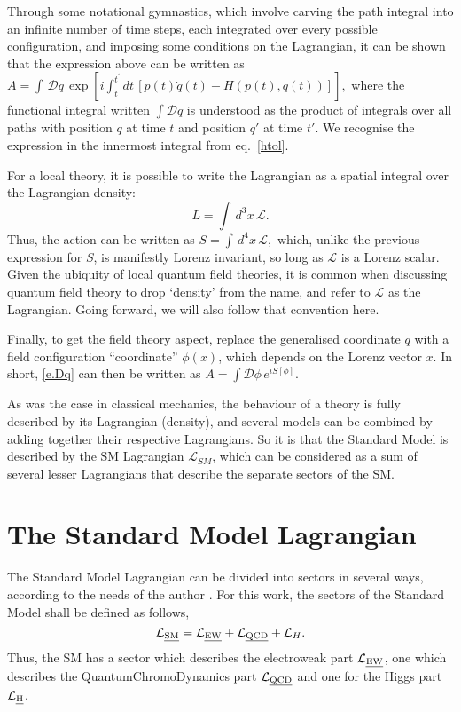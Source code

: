 Through some notational gymnastics, which involve carving the path integral into an infinite number of time steps, each integrated over every possible configuration, and imposing some conditions on the Lagrangian, it can be shown \cite{srednicki} that the expression above can be written as
\(A=\int\,\mathcal Dq\,\exp\left[i\int_t^{t^\prime}dt\,[p(t)\dot q(t)-H(p(t),q(t))]\right],\label{e.Dq}\)
where the functional integral written $\int\mathcal Dq$ is understood as the product of integrals over all paths with position $q$ at time $t$ and position $q\prime$ at time $t\prime$. We recognise the expression in the innermost integral from eq.~\eqref{htol}.

For a local theory, it is possible to write the Lagrangian as a spatial integral over the Lagrangian density:
\[L=\int \,d^3x\,\mathcal L.\]
Thus, the action can be written as
\(S=\int\,d^4x\,\mathcal L,\label{e.S}\)
which, unlike the previous expression for $S$, is manifestly Lorenz invariant, so long as $\mathcal L$ is a Lorenz scalar. Given the ubiquity of local quantum field theories, it is common when discussing quantum field theory to drop `density' from the name, and refer to $\mathcal L$ as the Lagrangian. Going forward, we will also follow that convention here.

Finally, to get the field theory aspect, replace the generalised coordinate $q$ with a field configuration ``coordinate'' $\phi(x)$, which depends on the Lorenz vector $x$. In short, \eqref{e.Dq} can then be written as
\(A=\int\mathcal D\phi\, e^{iS[\phi]}.\label{e.Dphi}\)

As was the case in classical mechanics, the behaviour of a theory is fully described by its Lagrangian (density), and several models can be combined by adding together their respective Lagrangians. So it is that the Standard Model is described by the SM Lagrangian $\mathcal L_\textit{SM}$, which can be considered as a sum of several lesser Lagrangians that describe the separate sectors of the SM.

\section{The Standard Model Lagrangian}

The Standard Model Lagrangian can be divided into sectors in several ways, according to the needs of the author \cite{srednicki,wikism}. For this work, the sectors of the Standard Model shall be defined as follows,
\[\mathcal{L}_{\text{\emph{SM}}}=\mathcal{L}_{\text{\emph{EW}}}+\mathcal{L}_{\text{\emph{QCD}}}+\mathcal{L}_{H}.\]
Thus, the SM has a sector which describes the electroweak part $\mathcal{L}_{\text{\emph{EW}}}$, one which describes the QuantumChromoDynamics part $\mathcal{L}_{\text{\emph{QCD}}}$ and one for the Higgs part $\mathcal{L}_{\text{\emph{H}}}$.

